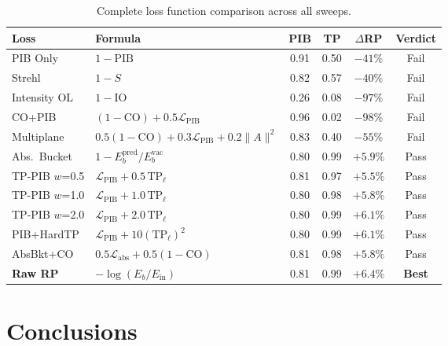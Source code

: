 \documentclass[11pt,a4paper]{article}
\begin{document}
\begin{table}[H]
\centering
\caption{Complete loss function comparison across all sweeps.}
\small
\begin{tabularx}{\textwidth}{l X c c c c}
\toprule
Loss & Formula & PIB & TP & $\Delta$RP & Verdict \\
\midrule
PIB Only & $1 - \mathrm{PIB}$ & 0.91 & 0.50 & $-41\%$ & \textcolor{negative}{Fail} \\
Strehl & $1 - S$ & 0.82 & 0.57 & $-40\%$ & \textcolor{negative}{Fail} \\
Intensity OL & $1 - \mathrm{IO}$ & 0.26 & 0.08 & $-97\%$ & \textcolor{negative}{Fail} \\
CO+PIB & $(1\!-\!\mathrm{CO}) + 0.5\mathcal{L}_{\mathrm{PIB}}$ & 0.96 & 0.02 & $-98\%$ & \textcolor{negative}{Fail} \\
Multiplane & $0.5(1\!-\!\mathrm{CO})\!+\!0.3\mathcal{L}_{\mathrm{PIB}}\!+\!0.2\|A\|^2$ & 0.83 & 0.40 & $-55\%$ & \textcolor{negative}{Fail} \\
\midrule
Abs.\ Bucket & $1 - E_b^{\mathrm{pred}}/E_b^{\mathrm{vac}}$ & 0.80 & 0.99 & $+5.9\%$ & \textcolor{positive}{Pass} \\
TP-PIB $w$=0.5 & $\mathcal{L}_{\mathrm{PIB}} + 0.5\,\mathrm{TP}_\ell$ & 0.81 & 0.97 & $+5.5\%$ & \textcolor{positive}{Pass} \\
TP-PIB $w$=1.0 & $\mathcal{L}_{\mathrm{PIB}} + 1.0\,\mathrm{TP}_\ell$ & 0.80 & 0.98 & $+5.8\%$ & \textcolor{positive}{Pass} \\
TP-PIB $w$=2.0 & $\mathcal{L}_{\mathrm{PIB}} + 2.0\,\mathrm{TP}_\ell$ & 0.80 & 0.99 & $+6.1\%$ & \textcolor{positive}{Pass} \\
PIB+HardTP & $\mathcal{L}_{\mathrm{PIB}} + 10(\mathrm{TP}_\ell)^2$ & 0.80 & 0.99 & $+6.1\%$ & \textcolor{positive}{Pass} \\
AbsBkt+CO & $0.5\mathcal{L}_{\mathrm{abs}} + 0.5(1\!-\!\mathrm{CO})$ & 0.81 & 0.98 & $+5.8\%$ & \textcolor{positive}{Pass} \\
\textbf{Raw RP} & $-\log(E_b/E_{\mathrm{in}})$ & 0.81 & 0.99 & $\mathbf{+6.4\%}$ & \textcolor{positive}{\textbf{Best}} \\
\bottomrule
\end{tabularx}
\end{table}

\section{Conclusions}
\label{sec:conclusions}
\end{document}

